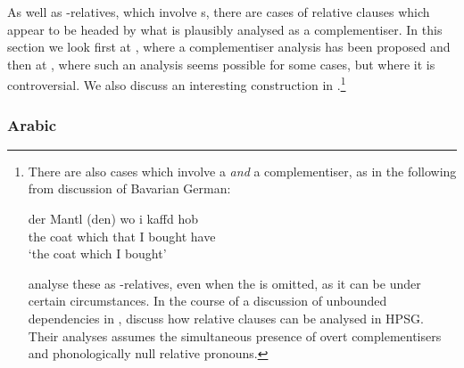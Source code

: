 \documentclass[output=paper,biblatex,babelshorthands,newtxmath,draftmode,colorlinks,citecolor=brown]{langscibook}
\begin{document}
\largerpage
As well as -relatives, which involve s, there are cases of relative clauses
which appear to be headed by what is plausibly analysed as a complementiser. In this
section we look first at , where a complementiser analysis has been proposed and
then at , where such an analysis seems possible for some cases, but where it is
controversial. We also discuss an interesting construction in .\footnote{There are also cases which involve a  \emph{and} a
  complementiser, as in the following from  discussion of
  Bavarian German:
  \begin{exe}
    \ex \gll der Mantl (den) wo i kaffd hob\\
    the coat \hphantom{(}which that I bought have\\
    \glt `the coat which I bought’
  \end{exe}
  \citet{Hinrichs:Nakazawa:02} analyse these as -relatives, even when the  is omitted,
  as it can be under certain circumstances. In the course of a discussion of unbounded
  dependencies in , \citet{Assmann:Heck:ea:10} discuss how  relative
  clauses can be analysed in HPSG. Their analyses assumes the simultaneous presence of overt
  complementisers and phonologically null relative pronouns.}

\subsubsection{Arabic}
\label{sec:rc-arabic}
\end{document}
